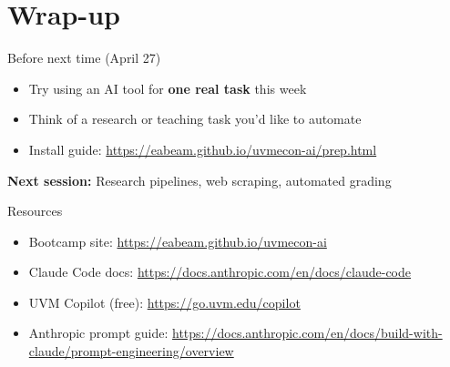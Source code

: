 \documentclass[aspectratio=169]{beamer}
\begin{document}
\section{Wrap-up}

\begin{frame}{Before next time (April 27)}
\begin{itemize}
    \item Try using an AI tool for \textbf{one real task} this week
    \item Think of a research or teaching task you'd like to automate
    \item Install guide: \url{https://eabeam.github.io/uvmecon-ai/prep.html}
\end{itemize}

\bigskip
\textbf{Next session:} Research pipelines, web scraping, automated grading
\end{frame}

\begin{frame}{Resources}
\begin{itemize}
    \item Bootcamp site: \url{https://eabeam.github.io/uvmecon-ai}
    \item Claude Code docs: \url{https://docs.anthropic.com/en/docs/claude-code}
    \item UVM Copilot (free): \url{https://go.uvm.edu/copilot}
    \item Anthropic prompt guide: \url{https://docs.anthropic.com/en/docs/build-with-claude/prompt-engineering/overview}
\end{itemize}
\end{frame}
\end{document}
